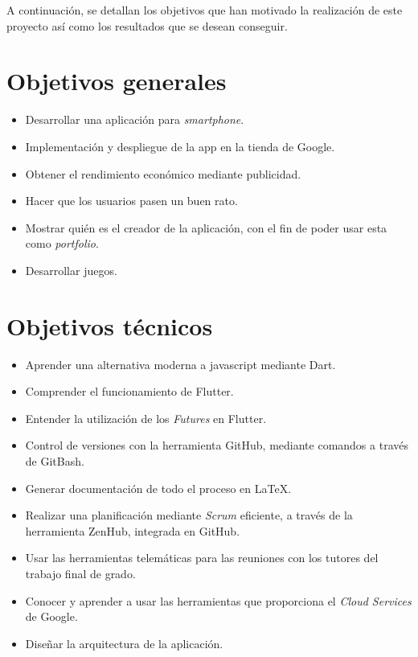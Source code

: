 

A continuación, se detallan los objetivos que han motivado la realización de este proyecto así como los resultados que se desean conseguir.

\section{Objetivos generales}
\begin{itemize}
	\item Desarrollar una aplicación para \emph{smartphone}.
	\item Implementación y despliegue de la app en la tienda de Google.
	\item Obtener el rendimiento económico mediante publicidad.
	\item Hacer que los usuarios pasen un buen rato.
	\item Mostrar quién es el creador de la aplicación, con el fin de poder usar esta como \emph{portfolio}.
	\item Desarrollar juegos.
\end{itemize}

\section{Objetivos técnicos}
\begin{itemize}
	\item Aprender una alternativa moderna a javascript mediante Dart.
	\item Comprender el funcionamiento de Flutter.
	\item Entender la utilización de los \emph{Futures} en Flutter.
	\item Control de versiones con la herramienta GitHub, mediante comandos a través de GitBash.
	\item Generar documentación de todo el proceso en \LaTeX.
	\item Realizar una planificación mediante \emph{Scrum} eficiente, a través de la herramienta ZenHub, integrada en GitHub.
	\item Usar las herramientas telemáticas para las reuniones con los tutores del trabajo final de grado. 
	\item Conocer y aprender a usar las herramientas que proporciona el \emph{Cloud Services} de Google.
	\item Diseñar la arquitectura de la aplicación.
	
\end{itemize}

